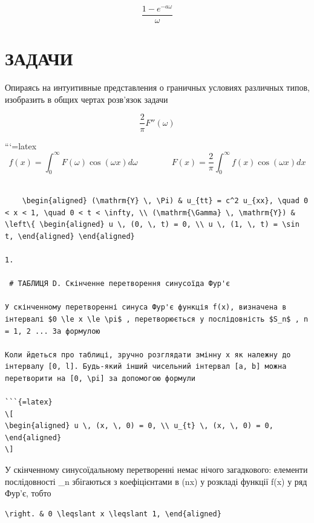 \documentclass[
  ukrainian,
]{article}
\begin{document}
\[
\frac{1-e^{-a\omega}}{\omega}
\]

\section{ЗАДАЧИ}\label{ux437ux430ux434ux430ux447ux438-1}

Опираясь на интуитивные представления о граничных условиях различных
типов, изобразить в общих чертах розв'язок задачи

\[
\frac{2}{\pi}F''(\omega)
\]

```{=latex}
\[
f(x) = \int_{0}^{\infty} F(\omega) \cos(\omega x) d\omega \qquad \qquad F(x) = \frac{2}{\pi} \int_{0}^{\infty} f(x) \cos(\omega x) dx
\]

\begin{verbatim}

    \begin{aligned} (\mathrm{Y} \, \Pi) & u_{tt} = c^2 u_{xx}, \quad 0 < x < 1, \quad 0 < t < \infty, \\ (\mathrm{\Gamma} \, \mathrm{Y}) & \left\{ \begin{aligned} u \, (0, \, t) = 0, \\ u \, (1, \, t) = \sin t, \end{aligned} \end{aligned}

1.

 # ТАБЛИЦЯ D. Скінченне перетворення синусоїда Фур'є

У скінченному перетворенні синуса Фур'є функція f(x), визначена в інтервалі $0 \le x \le \pi$ , перетворюється у послідовність $S_n$ , n = 1, 2 ... За формулою

Коли йдеться про таблиці, зручно розглядати змінну x як належну до інтервалу [0, l]. Будь-який інший чисельний інтервал [a, b] можна перетворити на [0, \pi] за допомогою формули

```{=latex}
\[
\begin{aligned} u \, (x, \, 0) = 0, \\ u_{t} \, (x, \, 0) = 0, \end{aligned}
\]
\end{verbatim}

У скінченному синусоїдальному перетворенні немає нічого загадкового:
елементи послідовності \_n збігаються з коефіцієнтами в
\sin(nx) у розкладі функції f(x) у ряд Фур'є, тобто

\begin{verbatim}
\right. & 0 \leqslant x \leqslant 1, \end{aligned}
\end{verbatim}
\end{document}
